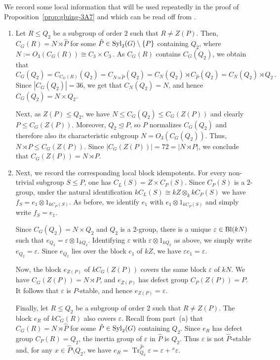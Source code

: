 \begin{rem}\label{rem:local-3A7}
    We record some local information that will be used repeatedly in the proof of Proposition~\ref{prop:gluing-3A7} and  which can be read off from \cite[Groups/Abstract/7560.g]{lmfdb}.  
    \begin{enumerate}[label=(\alph*)]
    \item
    Let $R\le Q_2$ be a subgroup of order $2$ such that $R\neq Z(P)$. Then, $C_G(R)=N\rtimes \hat{P}$
    for some $\hat{P}\in \operatorname{Syl}_2(G)\setminus \{P\}$ containing $Q_2$, where 
    \(
    N:=O_3(C_G(R))\cong C_3\times C_3\,.
    \)
    As $C_G(R)$ contains $C_G(Q_2)$, we obtain that
    \[
    C_G(Q_2)=C_{C_G(R)}(Q_2)=C_{N\rtimes\hat{P}}(Q_2)=C_N(Q_2)\rtimes C_{\hat{P}}(Q_2)= C_N(Q_2)\rtimes Q_2\,.
    \]
    Since $|C_G(Q_2)|=36$, we get that $C_N(Q_2)=N$, and hence $C_G(Q_2)=N\times Q_2$.
    
    Next, as $Z(P)\leq Q_2$, we have $N\leq C_G(Q_2)\leq C_G(Z(P))$
    and clearly $P\leq C_G(Z(P))$. Moreover, $Q_2\unlhd P$, so $P$ normalizes $C_G(Q_2)$ and therefore also its characteristic subgroup $N=O_3(C_G(Q_2))$. Thus, $N\rtimes P\leq C_G(Z(P))$. Since $|C_G(Z(P))|=72=|N\rtimes P|$, we conclude that $C_G(Z(P))=N\rtimes P$. 

    \item
    Next, we record the corresponding local block idempotents. For every non-trivial subgroup $S\le P$, one has $C_L(S)=Z\times C_P(S)$. Since $C_P(S)$ is a $2$-group, under the natural identification $kC_L(S)\cong kZ\otimes_k kC_P(S)$ we have $f_S=e_1\otimes 1_{kC_P(S)}$. As before, we identify $e_1$ with
    $e_1\otimes 1_{kC_P(S)}$ and simply write $f_S=e_1$.
    
    Since $C_G(Q_2)=N\times Q_2$ and $Q_2$ is a $2$-group, there is a unique $\varepsilon\in\operatorname{Bl}(kN)$ such that $e_{Q_2}=\varepsilon\otimes 1_{kQ_2}$. Identifying $\varepsilon$ with $\varepsilon\otimes 1_{kQ_2}$ as above, we simply write $e_{Q_2}=\varepsilon$. Since $e_{Q_2}$ lies over the block $e_1$ of $kZ$, we have $\varepsilon e_1=\varepsilon$. 
    
    Now, the block $e_{Z(P)}$ of $kC_G(Z(P))$ covers the same block $\varepsilon$ of $kN$. We have $C_G(Z(P))=N\rtimes P$, and $e_{Z(P)}$ has defect group $C_P(Z(P))=P$. It follows that $\varepsilon$ is $P$-stable, and hence $e_{Z(P)}=\varepsilon$.
    
    Finally, let $R\leq Q_2$ be a subgroup of order $2$ such that $R\neq Z(P)$. The block $e_R$ of $kC_G(R)$ also covers $\varepsilon$. Recall from part~{\rm (a)} that $C_G(R)=N\rtimes\hat P$
    for some $\hat P\in\operatorname{Syl}_2(G)$ containing $Q_2$. Since $e_R$ has defect group $C_P(R)=Q_2$, the inertia group of $\varepsilon$ in $\hat P$ is $Q_2$. Thus $\varepsilon$ is not $\hat P$-stable and, for any $x\in\hat P\setminus Q_2$, we have $e_R = \operatorname{Tr}_{Q_2}^{\hat P}\varepsilon=\varepsilon+{}^x\varepsilon$. 
\end{enumerate}    
\end{rem}

